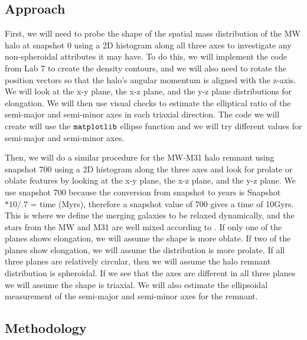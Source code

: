 \documentclass[linenumbers, twocolumn]{aastex631}
\begin{document}
\subsection{Approach} \label{sec:approach}
First, we will need to probe the shape of the spatial mass distribution of the MW halo at snapshot 0 using a 2D histogram along all three axes to investigate any non-spheroidal attributes it may have. To do this, we will implement the code from Lab 7 to create the density contours, and we will also need to rotate the position vectors so that the halo's angular momentum is aligned with the z-axis. We will look at the x-y plane, the x-z plane, and the y-z plane distributions for elongation.
We will then use visual checks to estimate the elliptical ratio of the semi-major and semi-minor axes in each triaxial direction.
The code we will create will use the $\tt{matplotlib}$ ellipse function and we will try different values for semi-major and semi-minor axes. 

Then, we will do a similar procedure for the MW-M31 halo remnant using snapshot 700 using a 2D histogram along the three axes and look for prolate or oblate features by looking at the x-y plane, the x-z plane, and the y-z plane. We use snapshot 700 because the conversion from snapshot to years is Snapshot$*10/.7$ = time (Myrs), therefore a snapshot value of 700 gives a time of 10Gyrs. This is where we define the merging galaxies to be relaxed dynamically, and the stars from the MW and M31 are well mixed according to \cite{2012VanDerMarel}. If only one of the planes shows elongation, we will assume the shape is more oblate. If two of the planes show elongation, we will assume the distribution is more prolate. If all three planes are relatively circular, then we will assume the halo remnant distribution is spheroidal. If we see that the axes are different in all three planes we will assume the shape is triaxial. We will also estimate the ellipsoidal measurement of the semi-major and semi-minor axes for the remnant.




\subsection{Methodology} \label{sec:method}
\end{document}
